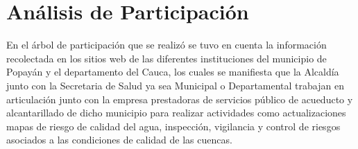 \section{Análisis de Participación}
  
  En el árbol de participación que se realizó se tuvo en cuenta la información recolectada en los sitios web de las diferentes instituciones del municipio de Popayán y el departamento del Cauca, los cuales se manifiesta que la Alcaldía junto con la Secretaria de Salud ya sea Municipal o Departamental trabajan en articulación junto con la empresa prestadoras de servicios público de acueducto y alcantarillado de dicho municipio para realizar actividades como actualizaciones mapas de riesgo de calidad del agua, inspección, vigilancia y control de riesgos asociados a las condiciones de calidad de las cuencas. 

